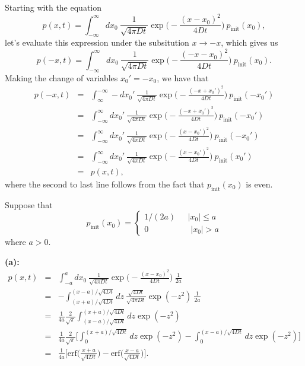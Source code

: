 Starting with the equation 
\begin{equation}
p(x,t) = \int_{-\infty}^{\infty} dx_0~\frac{1}{\sqrt{4 \pi D t} } \exp\bigg(- \frac{(x-x_0)^2}{4 D t}\bigg)~p_\text{init}(x_0),
\end{equation}
let's evaluate this expression under the subsitution $x \rightarrow -x$, which gives us
\begin{equation}
p(-x,t) = \int_{-\infty}^{\infty} dx_0~\frac{1}{\sqrt{4 \pi D t} } \exp\bigg(- \frac{(-x-x_0)^2}{4 D t}\bigg)~p_\text{init}(x_0).
\end{equation}
Making the change of variables $x_0' = -x_0$, we have that
\begin{eqnarray}
p(-x,t) &=& \int_{\infty}^{-\infty} -dx_0'~\frac{1}{\sqrt{4 \pi D t} } \exp\bigg(- \frac{(-x+x_0')^2}{4 D t}\bigg)~p_\text{init}(-x_0') \nonumber \\
&=& \int_{-\infty}^{\infty} dx_0'~\frac{1}{\sqrt{4 \pi D t} } \exp\bigg(- \frac{(-x+x_0')^2}{4 D t}\bigg)~p_\text{init}(-x_0') \nonumber \\
&=& \int_{-\infty}^{\infty} dx_0'~\frac{1}{\sqrt{4 \pi D t} } \exp\bigg(- \frac{(x-x_0')^2}{4 D t}\bigg)~p_\text{init}(-x_0') \nonumber \\
&=& \int_{-\infty}^{\infty} dx_0'~\frac{1}{\sqrt{4 \pi D t} } \exp\bigg(- \frac{(x-x_0')^2}{4 D t}\bigg)~p_\text{init}(x_0') \nonumber \\
&=& p(x,t),
\end{eqnarray}
where the second to last line follows from the fact that $p_\text{init}(x_0)$ is even.

Suppose that
\begin{equation*}
p_\text{init}(x_0) =  \left\{
        \begin{array}{ll}
            1/(2a) & ~~~|x_0| \leq a \\
            0 & \quad |x_0|>a
        \end{array}
    \right.
\end{equation*}
where $a>0$.

\textbf{(a):} 
\begin{eqnarray}
p(x,t) &=& \int_{-a}^{a} dx_0~\frac{1}{\sqrt{4 \pi D t} } \exp\bigg(- \frac{(x-x_0)^2}{4 D t}\bigg)~\frac{1}{2a} \nonumber \\
&=& -\int_{(x+a)/\sqrt{4Dt}}^{(x-a)/\sqrt{4Dt}} dz~\frac{\sqrt{4Dt}}{\sqrt{4 \pi D t} } \exp(- z^2)~\frac{1}{2a} \nonumber \\
&=& \frac{1}{4a} \frac{2}{\sqrt{\pi}} \int_{(x-a)/\sqrt{4Dt}}^{(x+a)/\sqrt{4Dt}} dz \exp(-z^2) \nonumber \\
&=& \frac{1}{4a} \frac{2}{\sqrt{\pi}} \bigg[ \int_{0}^{(x+a)/\sqrt{4Dt}} dz \exp(-z^2) - \int_{0}^{(x-a)/\sqrt{4Dt}} dz \exp(-z^2) \bigg] \\
&=&  \frac{1}{4a} \Bigg[ \text{erf}\bigg(\frac{x+a}{\sqrt{4 D t}}\bigg) - \text{erf}\bigg(\frac{x-a}{\sqrt{4 D t}}\bigg)\Bigg].
\end{eqnarray}

